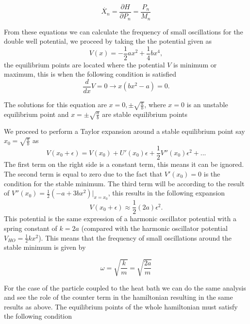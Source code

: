 \begin{equation}
\dot{X_n}=\frac{\partial H}{\partial P_n}=\frac{P_n}{M_n}
\end{equation}

From these equations we can calculate the frequency of small oscillations for the double well potential, we proceed by taking the the potential given as
\begin{equation}
V(x)=-\frac{1}{2}ax^2+\frac{1}{4}bx^4,
\end{equation}
the equilibrium points are located where the potential $V$ is minimum or maximum, this is when the following condition is satisfied
\begin{equation}
\frac{d}{dx}V=0\rightarrow x(bx^2-a) = 0.
\end{equation}

The solutions for this equation are $x=0,\pm \sqrt{\frac{a}{b}}$, where $x=0$ is an unstable equilibrium point and $x=\pm \sqrt{\frac{a}{b}}$ are stable equilibrium points \par 
We proceed to perform a Taylor expansion around a stable equilibrium point say $x_0=\sqrt{\frac{a}{b}}$ as
\begin{equation}
V(x_0 +\epsilon )=V(x_0)+U'(x_0)\epsilon + \frac{1}{2}V''(x_0)\epsilon ^2 + ...
\end{equation}
The first term on the right side is a constant term, this means it can be ignored. The second term is equal to zero due to the fact that $V'(x_0)=0$ is the condition for the stable minimum. The third term will be according to the result of $V''(x_0)=\frac{1}{2}(-a+3bx^2)| _{x=x_0}$, this results in the following expansion
\begin{equation}
V(x_0+\epsilon)\approx \frac{1}{2}(2a)\epsilon ^2.
\end{equation}
This potential is the same expression of a harmonic oscillator potential with a spring constant of $k=2a$ (compared with the harmonic oscillator potential $V_{HO}=\frac{1}{2}kx^2$). This means that the frequency of small oscillations around the stable minimum is given by

\begin{equation}
\omega =\sqrt{\frac{k}{m}}=\sqrt{\frac{2a}{m}}
\end{equation}

For the case of the particle coupled to the heat bath we can do the same analysis and see the role of the counter term in the hamiltonian resulting in the same results as above. The equilibrium points of the whole hamiltonian must satisfy the following condition

